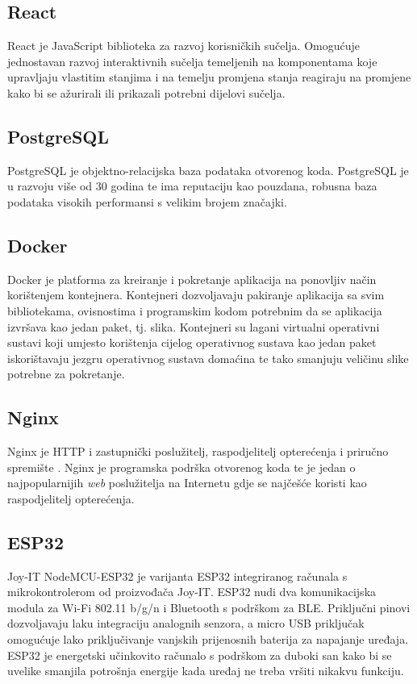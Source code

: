 \documentclass[times, utf8, diplomski]{fer}
\begin{document}
\subsection{React}
React\citep{React} je JavaScript biblioteka za razvoj korisničkih sučelja. Omogućuje jednostavan razvoj interaktivnih sučelja temeljenih na komponentama koje upravljaju vlastitim stanjima i na temelju promjena stanja reagiraju na promjene kako bi se ažurirali ili prikazali potrebni dijelovi sučelja.

\subsection{PostgreSQL}
PostgreSQL\citep{PostgreSQL} je objektno-relacijska baza podataka otvorenog koda. PostgreSQL je u razvoju više od 30 godina te ima reputaciju kao pouzdana, robusna baza podataka visokih performansi s velikim brojem značajki. 

\subsection{Docker}
Docker\citep{Docker} je platforma za kreiranje i pokretanje aplikacija na ponovljiv način korištenjem kontejnera. Kontejneri dozvoljavaju pakiranje aplikacija sa svim bibliotekama, ovisnostima i programskim kodom potrebnim da se aplikacija izvršava kao jedan paket, tj. slika. Kontejneri su lagani virtualni operativni sustavi koji umjesto korištenja cijelog operativnog sustava kao jedan paket iskorištavaju jezgru operativnog sustava domaćina te tako smanjuju veličinu slike potrebne za pokretanje.

\subsection{Nginx}
Nginx\citep{NGINX} je HTTP i zastupnički  poslužitelj, raspodjelitelj opterećenja i priručno spremište . Nginx je programska podrška otvorenog koda te je jedan o najpopularnijih \emph{web} poslužitelja na Internetu gdje se najčešće koristi kao raspodjelitelj opterećenja.

\subsection{ESP32}
Joy-IT NodeMCU-ESP32\citep{ESP32Img} je varijanta ESP32 integriranog računala s mikrokontrolerom od proizvođača Joy-IT. ESP32 nudi dva komunikacijska modula za Wi-Fi 802.11 b/g/n i Bluetooth s podrškom za BLE. Priključni pinovi dozvoljavaju laku integraciju analognih senzora, a micro USB priključak omogućuje lako priključivanje vanjskih prijenosnih baterija za napajanje uređaja. ESP32 je energetski učinkovito računalo s podrškom za duboki san kako bi se uvelike smanjila potrošnja energije kada uređaj ne treba vršiti nikakvu funkciju.
\end{document}
